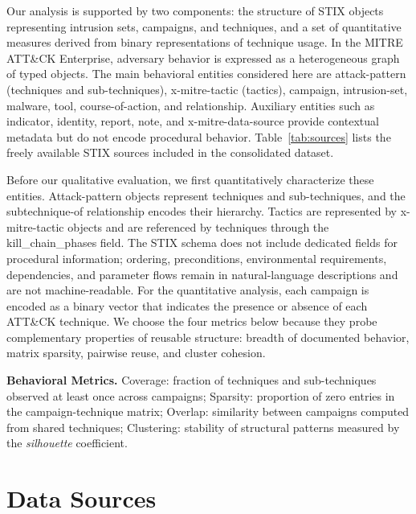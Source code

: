 \documentclass[sigconf]{acmart}
\newcommand{\stix}{STIX\xspace}
\newcommand{\mitre}{MITRE\xspace}
\newcommand{\attack}{ATT\&CK\xspace}
\begin{document}
Our analysis is supported by two components: the structure of \stix{} objects representing intrusion sets, campaigns, and techniques, and a set of quantitative measures derived from binary representations of technique usage. In the \mitre{} \attack{} Enterprise, adversary behavior is expressed as a heterogeneous graph of typed objects. The main behavioral entities considered here are attack-pattern (techniques and sub-techniques), x-mitre-tactic (tactics), campaign, intrusion-set, malware, tool, course-of-action, and relationship. Auxiliary entities such as indicator, identity, report, note, and x-mitre-data-source provide contextual metadata but do not encode procedural behavior. Table~\ref{tab:sources} lists the freely available \stix{} sources included in the consolidated dataset.

Before our qualitative evaluation, we first quantitatively characterize these entities. Attack-pattern objects represent techniques and sub-techniques, and the subtechnique-of relationship encodes their hierarchy. Tactics are represented by x-mitre-tactic objects and are referenced by techniques through the kill\_chain\_phases field. The \stix{} schema does not include dedicated fields for procedural information; ordering, preconditions, environmental requirements, dependencies, and parameter flows remain in natural-language descriptions and are not machine-readable. For the quantitative analysis, each campaign is encoded as a binary vector that indicates the presence or absence of each \attack{} technique. We choose the four metrics below because they probe complementary properties of reusable structure: breadth of documented behavior, matrix sparsity, pairwise reuse, and cluster cohesion.

\begin{textbox}
\textbf{Behavioral Metrics.}
Coverage: fraction of techniques and sub-techniques observed at least once across campaigns;
Sparsity: proportion of zero entries in the campaign-technique matrix;
Overlap: similarity between campaigns computed from shared techniques;
Clustering: stability of structural patterns measured by the \emph{silhouette} coefficient.
\end{textbox}

\section{Data Sources}
\label{sec:dataset}
\end{document}
